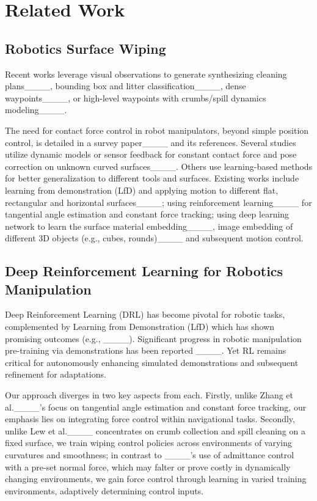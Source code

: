 \section{Related Work}
\subsection{Robotics Surface Wiping}

Recent works leverage visual observations to generate synthesizing cleaning plans____, bounding box and litter classification____, dense waypoints____, or high-level waypoints with crumbs/spill dynamics modeling____. 

The need for contact force control in robot manipulators, beyond simple position control, is detailed in a survey paper____ and its references. Several studies utilize dynamic models or sensor feedback for constant contact force and pose correction on unknown curved surfaces____. Others use learning-based methods for better generalization to different tools and surfaces. Existing works include learning from demonstration (LfD) and applying motion to different flat, rectangular and horizontal surfaces____; using reinforcement learning____ for tangential angle estimation and constant force tracking; using deep learning network to learn the surface material embedding____, image embedding of different 3D objects (e.g., cubes, rounds)____ and subsequent motion control. 









\subsection{Deep Reinforcement Learning for Robotics Manipulation}



Deep Reinforcement Learning (DRL) has become pivotal for robotic tasks, complemented by Learning from Demonstration (LfD) which has shown promising outcomes (e.g., ____). Significant progress in robotic manipulation pre-training via demonstrations has been reported ____. 
Yet RL remains critical for autonomously enhancing simulated demonstrations and subsequent refinement for adaptations. 



Our approach diverges in two key aspects from each. Firstly, unlike Zhang et al.____'s focus on tangential angle estimation and constant force tracking, our emphasis lies on integrating force control within navigational tasks. 
Secondly, unlike Lew et al.____ concentrates on crumb collection and spill cleaning on a fixed surface, we train wiping control policies across environments of varying curvatures and smoothness; in contrast to ____'s use of admittance control with a pre-set normal force, which may falter or prove costly in dynamically changing environments, we gain force control through learning in varied training environments, adaptively determining control inputs.






